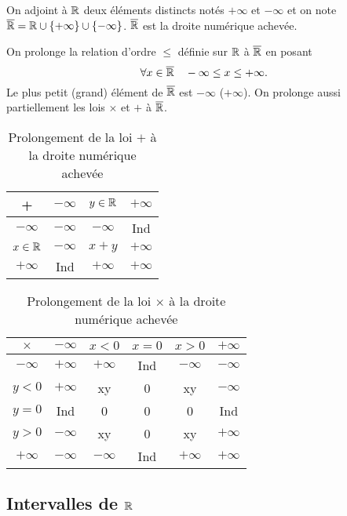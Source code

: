 \begin{defdef}
  On adjoint à $\mathbb{R}$ deux éléments distincts notés $+\infty$ et $-\infty$ et on note $\overline{\mathbb{R}}=\mathbb{R}\cup\{+\infty\}\cup\{-\infty\}$. $\overline{\mathbb{R}}$ est la droite numérique achevée. 
\end{defdef}
On prolonge la relation d'ordre $\leq$ définie sur $\mathbb{R}$ à $\overline{\mathbb{R}}$ en posant
\begin{equation}
  \forall x\in \overline{\mathbb{R}} \quad -\infty\leq x\leq +\infty.
\end{equation}
Le plus petit (grand) élément de $\overline{\mathbb{R}}$ est $-\infty$ ($+\infty$). On prolonge aussi partiellement les lois $\times$ et $+$ à $\overline{\mathbb{R}}$.
\begin{table}[!h]
\centering
\begin{tabular}{|c|c|c|c|}\hline
  + & $-\infty$ & $y\in\mathbb{R}$ & $+\infty$ \\ \hline
  $-\infty$ & $-\infty$ & $-\infty$& Ind \\ \hline
  $x\in\mathbb{R}$ & $-\infty$ & $x+y$ & $+\infty$ \\ \hline
  $+\infty$ & Ind & $+\infty$ & $+\infty$ \\ \hline 
\end{tabular}
\caption{Prolongement de la loi $+$ à la droite numérique achevée}
\end{table}
\begin{table}[!h]
\centering
\begin{tabular}{|c|c|c|c|c|c|}\hline
  $\times$ & $-\infty$ & $x<0$ & $x=0$ & $x>0$ & $+\infty$ \\ \hline
  $-\infty$ & $+\infty$& $+\infty$& Ind& $-\infty$& $-\infty$\\ \hline
  $y<0$ &$+\infty$ & xy& 0& xy& $-\infty$\\ \hline
  $y=0$ & Ind& 0& 0& 0&Ind \\ \hline
  $y>0$ & $-\infty$& xy& 0& xy& $+\infty$\\ \hline
  $+\infty$ & $-\infty$& $-\infty$& Ind& $+\infty$ & $+\infty$\\ \hline 
\end{tabular}
\caption{Prolongement de la loi $\times$ à la droite numérique achevée}
\end{table}

\subsection{Intervalles de $\mathbb{R}$}


